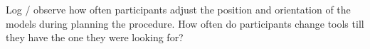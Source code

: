 Log / observe how often participants adjust the position and orientation of the models during planning the procedure.
How often do participants change tools till they have the one they were looking for?